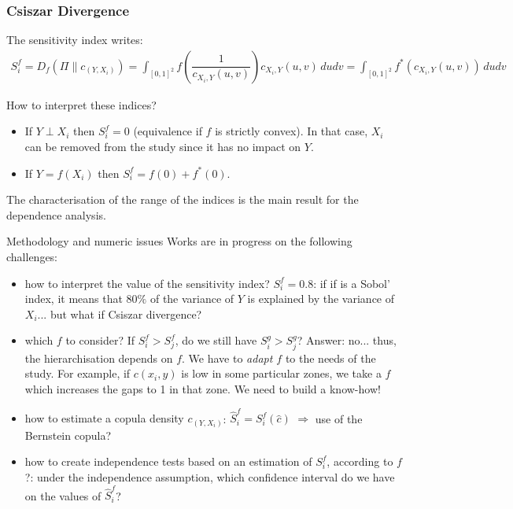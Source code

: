 \documentclass[8pt]{beamer}
\begin{document}
\begin{frame}
  \frametitle{Csiszar Divergence}
\small
The sensitivity index writes:
    \begin{align*}
      S_i^f= D_f(\Pi \| c_{(Y,X_i)}) = \int_{[0,1]^2}f\left(\dfrac{1}{c_{X_i,Y}(u,v)}\right)c_{X_i,Y}(u,v)\,dudv=\int_{[0,1]^2}f^*\left(c_{X_i,Y}(u,v)\right)\,dudv
    \end{align*}

  \begin{block}{How to interpret these indices?}
  \begin{itemize}
   \item \alert{If $Y \perp X_i$ then $S_i^f=0$}  (equivalence if $f$ is strictly convex). In that case, $X_i$ can be removed from the study since it has no impact on  $Y$.
   \item \alert{If $Y=f(X_i)$ then $S_i^f = f(0) + f^*(0)$}.
  \end{itemize}
The characterisation of the range of the indices is the main result for the dependence analysis.
  \end{block}

  \begin{block}{Methodology and numeric issues}
   Works are in progress on the following challenges: 
    \begin{itemize}
    \item \alert{how to interpret the value of the sensitivity index?} $S_i^f=0.8$: if if is a Sobol' index, it means that $80\%$ of the variance of $Y$ is explained by the variance of $X_i$... but what if Csiszar divergence?
    \item \alert{which  $f$ to consider?} If $S_i^{f} > S_j^{f}$, do we still have $S_i^{g} > S_j^{g}$? Answer: no... thus, the hierarchisation depends on $f$. We have to \emph{adapt $f$} to the needs of the study. For example, if $c(x_i, y)$ is low in some particular zones, we take a $f$ which increases the gaps to 1 in that zone. We need to build a know-how!
      \item \alert{how to estimate a copula density $c_{(Y,X_i)}$}:  $\hat{S}_i^f = S_i^f(\hat{c})$ $\Longrightarrow$ use of the Bernstein copula?
     \item \alert{how to create independence tests} based on an estimation of $S_i^f$, according to $f$?: under the independence assumption, which confidence interval do we have on the values of $\hat{S}_i^f$?
    \end{itemize}

  \end{block}

\end{frame}
\end{document}
